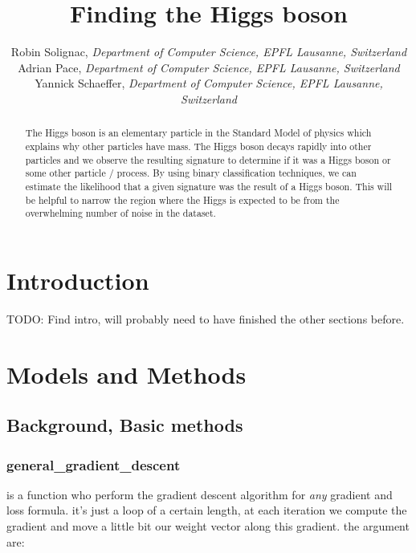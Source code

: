 \documentclass[10pt,conference,compsocconf]{IEEEtran}
\begin{document}
\title{Finding the Higgs boson}

\author{
  Robin Solignac,
  \textit{Department of Computer Science, EPFL Lausanne, Switzerland}\\
  Adrian Pace,
  \textit{Department of Computer Science, EPFL Lausanne, Switzerland}\\
  Yannick Schaeffer,
  \textit{Department of Computer Science, EPFL Lausanne, Switzerland}
}

\maketitle

\begin{abstract}
 The Higgs boson is an elementary particle in the Standard Model of physics which explains why other particles have mass. The Higgs boson decays rapidly into other particles and we observe the resulting signature to determine if it was a Higgs boson or some other particle / process. By using binary classification techniques, we can estimate the likelihood that a given signature was the result of a Higgs boson. This will be helpful to narrow the region where the Higgs is expected to be from the overwhelming number of noise in the dataset.
\end{abstract}

\section{Introduction}

TODO: Find intro, will probably need to have finished the other sections before.

\section{Models and Methods}
\subsection{Background, Basic methods}

\subsubsection{general\_gradient\_descent}

is a function who perform the gradient descent algorithm for \emph{any}
gradient and loss formula. it's just a loop of a certain length, at
each iteration we compute the gradient and move a little bit our weight
vector along this gradient. the argument are:
\end{document}
